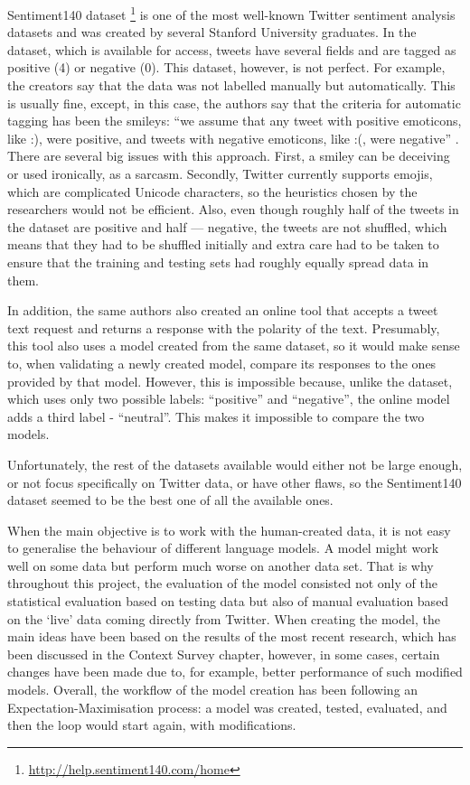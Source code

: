 Sentiment140 dataset \footnote{\url{http://help.sentiment140.com/home}} is one of the most well-known Twitter sentiment analysis datasets and was created by several Stanford University graduates. In the dataset, which is available for access, tweets have several fields and are tagged as positive (4) or negative (0). This dataset, however, is not perfect. For example, the creators say that the data was not labelled manually but automatically. This is usually fine, except, in this case, the authors say that the criteria for automatic tagging has been the smileys: ``we assume that any tweet with positive emoticons, like :), were positive, and tweets with negative emoticons, like :(, were negative'' \cite{sentiment140}. There are several big issues with this approach. First, a smiley can be deceiving or used ironically, as a sarcasm. Secondly, Twitter currently supports emojis, which are complicated Unicode characters, so the heuristics chosen by the researchers would not be efficient. Also, even though roughly half of the tweets in the dataset are positive and half --- negative, the tweets are not shuffled, which means that they had to be shuffled initially and extra care had to be taken to ensure that the training and testing sets had roughly equally spread data in them.

In addition, the same authors also created an online tool that accepts a tweet text request and returns a response with the polarity of the text. Presumably, this tool also uses a model created from the same dataset, so it would make sense to, when validating a newly created model, compare its responses to the ones provided by that model. However, this is impossible because, unlike the dataset, which uses only two possible labels: ``positive'' and ``negative'', the online model adds a third label - ``neutral''. This makes it impossible to compare the two models. 

Unfortunately, the rest of the datasets available would either not be large enough, or not focus specifically on Twitter data, or have other flaws, so the Sentiment140 dataset seemed to be the best one of all the available ones. 

When the main objective is to work with the human-created data, it is not easy to generalise the behaviour of different language models. A model might work well on some data but perform much worse on another data set. That is why throughout this project, the evaluation of the model consisted not only of the statistical evaluation based on testing data but also of manual evaluation based on the `live' data coming directly from Twitter. When creating the model, the main ideas have been based on the results of the most recent research, which has been discussed in the Context Survey chapter, however, in some cases, certain changes have been made due to, for example, better performance of such modified models. Overall, the workflow of the model creation has been following an Expectation-Maximisation process: a model was created, tested, evaluated, and then the loop would start again, with modifications.


